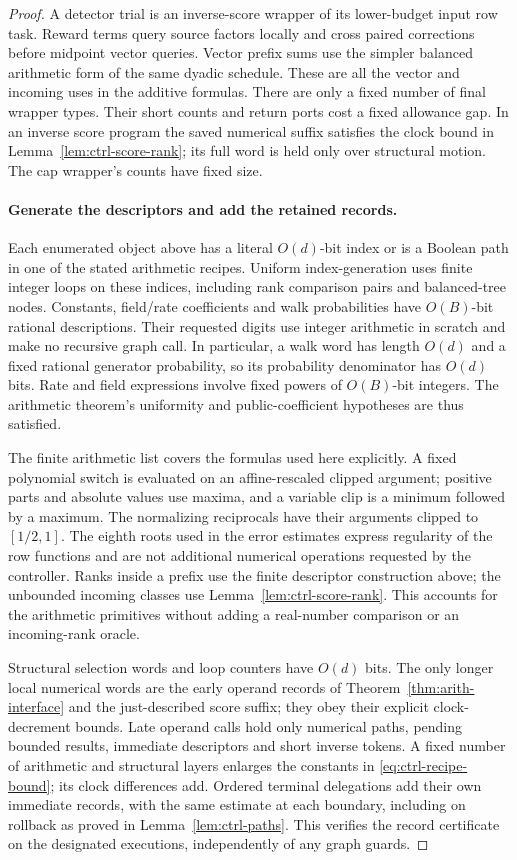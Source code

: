 \begin{proof}
A detector trial is an inverse-score wrapper of its lower-budget
input row task.  Reward terms query source factors locally and cross
paired corrections before midpoint vector queries.  Vector prefix sums
use the simpler balanced arithmetic form of the same dyadic schedule.
These are all the vector and incoming uses in the additive formulas.
There are only a fixed number of final wrapper types.  Their short
counts and return ports cost a fixed allowance gap.  In an inverse
score program the saved numerical suffix satisfies the clock bound in
Lemma~\ref{lem:ctrl-score-rank}; its full word is held only over
structural motion.  The cap wrapper's counts have fixed size.

\paragraph{Generate the descriptors and add the retained records.}
Each enumerated object above has a literal $O(d)$-bit index or is a
Boolean path in one of the stated arithmetic recipes.  Uniform
index-generation uses finite integer loops on these indices, including
rank comparison pairs and balanced-tree nodes.  Constants, field/rate
coefficients and walk probabilities have $O(B)$-bit rational
descriptions.  Their requested digits use integer arithmetic in scratch
and make no recursive graph call.  In particular, a walk word has
length $O(d)$ and a fixed rational generator probability, so its
probability denominator has $O(d)$ bits.  Rate and field expressions
involve fixed powers of $O(B)$-bit integers.  The arithmetic theorem's
uniformity and public-coefficient hypotheses are thus satisfied.

The finite arithmetic list covers the formulas used here explicitly.
A fixed polynomial switch is evaluated on an affine-rescaled clipped
argument; positive parts and absolute values use maxima, and a variable
clip is a minimum followed by a maximum.  The normalizing reciprocals
have their arguments clipped to $[1/2,1]$.  The eighth roots used in the
error estimates express regularity of the row functions and are not
additional numerical operations requested by the controller.  Ranks
inside a prefix use the finite descriptor construction above; the
unbounded incoming classes use Lemma~\ref{lem:ctrl-score-rank}.  This
accounts for the arithmetic primitives without adding a real-number
comparison or an incoming-rank oracle.

Structural selection words and loop counters have $O(d)$ bits.  The
only longer local numerical words are the early operand records of
Theorem~\ref{thm:arith-interface} and the just-described score suffix;
they obey their explicit clock-decrement bounds.  Late operand calls
hold only numerical paths, pending bounded results, immediate
descriptors and short inverse tokens.  A fixed number of arithmetic and
structural layers enlarges the constants in
\eqref{eq:ctrl-recipe-bound}; its clock differences add.  Ordered
terminal delegations add their own immediate records, with the same
estimate at each boundary, including on rollback as proved in
Lemma~\ref{lem:ctrl-paths}.  This verifies the record certificate on
the designated executions, independently of any graph guards.
\end{proof}

